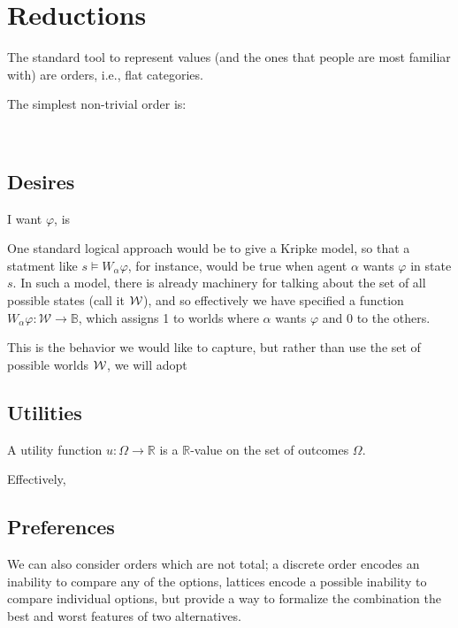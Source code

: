 \documentclass{article}
\begin{document}
	
	\section{Reductions}
	
	The standard tool to represent values (and the ones that people are most familiar with) are orders, i.e., flat categories. 
	
	The simplest non-trivial order is:
	\begin{center}
		~
	\end{center}
	
	\subsection{Desires}
	
	I want $\varphi$, is 
	
	One standard logical approach would be to give a Kripke model, so that a statment like $s \vDash W_{\alpha} \varphi$, for instance, would be true when agent $\alpha$ wants $\varphi$ in state $s$. In such a model, there is already machinery for talking about the set of all possible states (call it $\cal W$), and so effectively we have specified a function $W_\alpha \varphi: \mathcal W \to \mathbb B$, which assigns 1 to worlds where $\alpha$ wants $\varphi$ and 0 to the others.
	
	This is the behavior we would like to capture, but rather than use the set of possible worlds $\cal W$, we will adopt 
	
	
	\subsection{Utilities}
	
		
	
	A utility function $u : \Omega \to \mathbb R$ is a $\mathbb R$-value on the set of outcomes $\Omega$. 
	
	Effectively, 

	
	\subsection{Preferences}
	We can also consider orders which are not total; a discrete order encodes an inability to compare any of the options, lattices encode a possible inability to compare individual options, but provide a way to formalize the combination the best and worst features of two alternatives.
	
\end{document}
